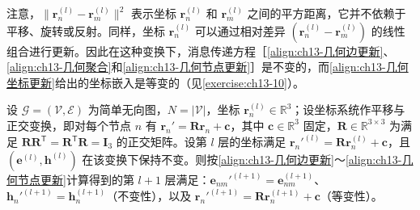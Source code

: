 \documentclass[../../main.tex]{subfiles}
\begin{document}
注意，$\|\bm{r}_n^{(l)}-\bm{r}_m^{(l)}\|^2$ 表示坐标 $\bm{r}_n^{(l)}$ 和 $\bm{r}_m^{(l)}$ 之间的平方距离，它并不依赖于平移、旋转或反射。同样，坐标 $\bm{r}_n^{(l)}$ 可以通过相对差异 $(\bm{r}_n^{(l)}-\bm{r}_m^{(l)})$ 的线性组合进行更新。因此在这种变换下，消息传递方程［\eqref{align:ch13-几何边更新}、\eqref{align:ch13-几何聚合}和\eqref{align:ch13-几何节点更新}］是不变的，而\eqref{align:ch13-几何坐标更新}给出的坐标嵌入是等变的（见\cref{exercise:ch13-10}）。

\begin{proposition}\label{proposition:ch13-几何等变性}
设 $\mathcal{G}=(\mathcal{V},\mathcal{E})$ 为简单无向图，$N=|\mathcal{V}|$，坐标 $\bm{r}_n^{(l)}\in\mathbb{R}^{3}$；设坐标系统作平移与正交变换，即对每个节点 $n$ 有 $\bm{r}_n'=\bm{R}\bm{r}_n+\bm{c}$，其中 $\bm{c}\in\mathbb{R}^{3}$ 固定，$\bm{R}\in\mathbb{R}^{3\times3}$ 为满足 $\bm{R}\bm{R}^{\mathsf T}=\bm{R}^{\mathsf T}\bm{R}=\bm{I}_3$ 的正交矩阵。设第 $l$ 层的坐标满足 $\bm{r}_n'^{(l)}=\bm{R}\bm{r}_n^{(l)}+\bm{c}$，且 $(\bm{e}^{(l)},\bm{h}^{(l)})$ 在该变换下保持不变。则按\eqref{align:ch13-几何边更新}～\eqref{align:ch13-几何节点更新}计算得到的第 $l+1$ 层满足：$\bm{e}_{nm}'^{(l+1)}=\bm{e}_{nm}^{(l+1)}$、$\bm{h}_n'^{(l+1)}=\bm{h}_n^{(l+1)}$（不变性），以及 $\bm{r}_n'^{(l+1)}=\bm{R}\bm{r}_n^{(l+1)}+\bm{c}$（等变性）。
\end{proposition}
\end{document}
